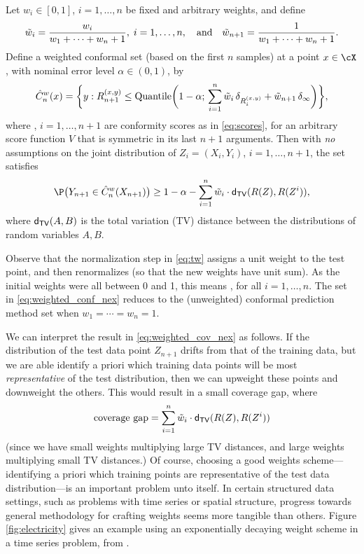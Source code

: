 \documentclass{article}
\begin{document}
\begin{theorem}
\label{thm:weighted_conf_nex}
Let $w_i \in [0,1]$, $i=1,\dots,n$ be fixed and arbitrary weights, and define 
\begin{equation}
\label{eq:tw}
\tilde{w}_i = \frac{w_i}{w_1 + \cdots + w_n + 1}, \; i=1,\ldots,n, 
\quad \text{and} \quad 
\tilde{w}_{n+1} = \frac{1}{w_1 + \cdots + w_n + 1}.
\end{equation}
Define a weighted conformal set (based on the first $n$ samples) at a point
$x \in \cX$, with nominal error level $\alpha \in (0,1)$, by   
\begin{equation}
\label{eq:weighted_conf_nex}
\hat{C}^w_n(x) = \bigg\{ y : R_{n+1}^{(x,y)} \leq \mathrm{Quantile}\bigg( 1-\alpha; 
\, \sum_{i=1}^n \tilde{w}_i \, \delta_{R_i^{(x,y)}} + \tilde{w}_{n+1} \, \delta_\infty
\bigg) \bigg\},   
\end{equation}
where , $i=1,\ldots,n+1$ are conformity scores as in
\eqref{eq:scores}, for an arbitrary score function $V$ that is symmetric in its
last $n+1$ arguments. Then with \emph{no} assumptions on the joint distribution
of $Z_i=(X_i,Y_i)$, $i=1,\dots,n+1$, the set  satisfies
\begin{equation}
\label{eq:weighted_cov_nex}
\P\big( Y_{n+1} \in \hC^w_n(X_{n+1}) \big) \geq 1-\alpha - \sum_{i=1}^n 
\tw_i \cdot \dtv(R(Z), R(Z^i)),
\end{equation}
where $\mathsf{d}_{\mathsf{TV}}(A,B)$ is the total variation (TV) distance between the distributions
of random variables $A,B$.  
\end{theorem}

Observe that the normalization step in \eqref{eq:tw} assigns a unit weight to 
the test point, and then renormalizes (so that the new weights have unit
sum). As the initial weights were all between 0 and 1, this means
, for all $i=1,\dots,n$. The set in
\eqref{eq:weighted_conf_nex} reduces to the (unweighted) conformal prediction
method set when $w_1 = \cdots = w_n = 1$.  

We can interpret the result in \eqref{eq:weighted_cov_nex} as follows. If the
distribution of the test data point $Z_{n+1}$ drifts from that of the training
data, but we are able identify a priori which training data points will be most
\emph{representative} of the test distribution, then we can upweight these
points and downweight the others. This would result in a small coverage gap, 
where  
\begin{equation}
\label{eq:coverage_gap}
\text{coverage gap} = \sum_{i=1}^n \tilde{w}_i \cdot \mathsf{d}_{\mathsf{TV}}(R(Z), R(Z^i))
\end{equation}
(since we have small weights multiplying large TV distances, and large weights 
multiplying small TV distances.) Of course, choosing a good weights
scheme---identifying a priori which training points are representative of the
test data distribution---is an important problem unto itself. In certain
structured data settings, such as problems with time series or spatial
structure, progress towards general methodology for crafting weights seems more
tangible than others. Figure \ref{fig:electricity} gives an example using an
exponentially decaying weight scheme in a time series problem, from
\citet{barber2022conformal}.  
\end{document}

